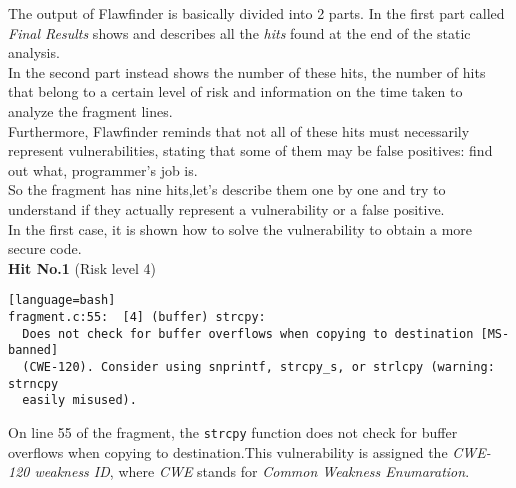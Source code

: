 \documentclass[a4paper,12pt]{article}
\begin{document}
The output of Flawfinder is basically divided into 2 parts.
In the first part called \textit{Final Results} shows and describes all the \textit{hits} found at the end of the static analysis.\\
In the second part instead shows the number of these hits, the number of hits that belong to a certain level of risk and information on the time taken to analyze the fragment lines.\\
Furthermore, Flawfinder reminds that not all of these hits must necessarily represent vulnerabilities, stating that some of them may be false positives: find out what, programmer's job is.\\
So the fragment has nine hits,let's describe them one by one and try to understand if they actually represent a vulnerability or a false positive.\\
In the first case, it is shown how to solve the vulnerability to obtain a more secure code.\\
\newpage
\textbf{Hit No.1} (Risk level 4)
\begin{lstlisting}[style=DOS][language=bash]
fragment.c:55:  [4] (buffer) strcpy:
  Does not check for buffer overflows when copying to destination [MS-banned]
  (CWE-120). Consider using snprintf, strcpy_s, or strlcpy (warning: strncpy
  easily misused).
\end{lstlisting}
On line 55 of the fragment, the \texttt{strcpy} function does not check for buffer overflows when copying to destination.This vulnerability is assigned the \textit{CWE-120 weakness ID}, where \textit{CWE} stands for \textit{Common Weakness Enumaration}\cite{CWE}.\\
\noindent
\end{document}

